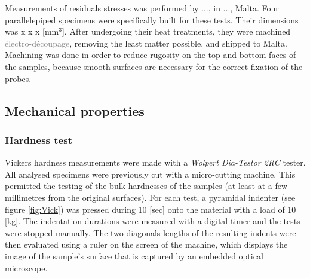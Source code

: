 Measurements of residuals stresses was performed by ..., in ..., Malta. Four parallelepiped specimens were specifically built for these tests. Their dimensions was x  x  x [mm$^3$]. After undergoing their heat treatments, they were machined \textcolor{gray}{électro-découpage}, removing the least matter possible, and shipped to Malta. Machining was done in order to reduce rugosity on the top and bottom faces of the samples, because smooth surfaces are necessary for the correct fixation of the probes. \\

\subsection{Mechanical properties}

\subsubsection{Hardness test}

Vickers hardness measurements were made with a \textit{Wolpert Dia-Testor 2RC} tester. All analysed specimens were previously cut with a micro-cutting machine. This permitted the testing of the bulk hardnesses of the samples (at least at a few millimetres from the original surfaces). For each test, a pyramidal indenter (see figure \ref{fig:Vick}) was pressed during 10 [sec] onto the material with a load of 10 [kg]. The indentation durations were measured with a digital timer and the tests were stopped manually. The two diagonals lengths of the resulting indents were then evaluated using a ruler on the screen of the machine, which displays the image of the sample's surface that is captured by an embedded optical microscope.\\

